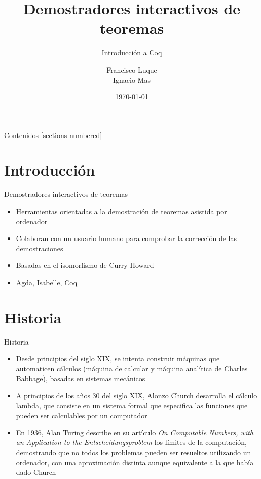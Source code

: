 \documentclass[10pt]{beamer}
\title{Demostradores interactivos de teoremas}
\subtitle{Introducción a Coq}
\date{\today}
\author{Francisco Luque \\ Ignacio Mas}
\institute{Universidad de Granada}
\begin{document}
\maketitle

\begin{frame}{Contenidos}
  [sections numbered]
  \tableofcontents[hideallsubsections]
\end{frame}

\section{Introducción}

\begin{frame}{Demostradores interactivos de teoremas}

  \begin{itemize}
  \item Herramientas orientadas a la demostración de teoremas asistida
    por ordenador
  \item Colaboran con un usuario humano para comprobar la corrección
    de las demostraciones
  \item Basadas en el isomorfismo de Curry-Howard
  \item Agda, Isabelle, Coq
  \end{itemize}

\end{frame}

\section{Historia}

\begin{frame}[fragile]{Historia}

  \begin{itemize}
  \item Desde principios del siglo XIX, se intenta construir máquinas
    que automaticen cálculos (máquina de calcular y máquina analítica
    de Charles Babbage), basadas en sistemas mecánicos
  \item A principios de los años 30 del siglo XIX, Alonzo Church
    desarrolla el cálculo lambda, que consiste en un sistema formal
    que especifica las funciones que pueden ser calculables por un
    computador
  \item En 1936, Alan Turing describe en su artículo \textit{On
      Computable Numbers, with an Application to the
      Entscheidungsproblem} los límites de la computación, demostrando
    que no todos los problemas pueden ser resueltos utilizando un
    ordenador, con una aproximación distinta aunque equivalente a la
    que había dado Church
  \end{itemize}

\end{frame}
\end{document}

